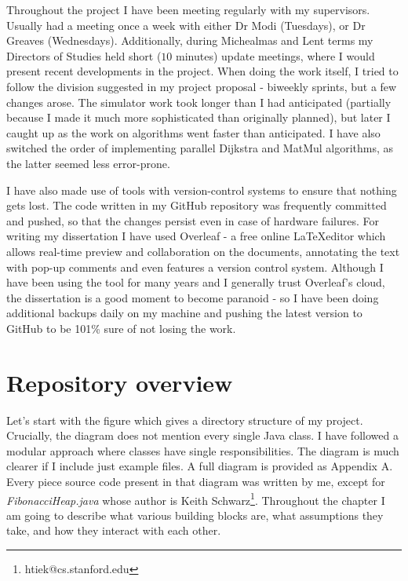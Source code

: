 \documentclass[12pt,a4paper,twoside,openright]{report}
\begin{document}
Throughout the project I have been meeting regularly with my supervisors. Usually had a meeting once a week with either Dr Modi (Tuesdays), or Dr Greaves (Wednesdays). Additionally, during Michealmas and Lent terms my Directors of Studies held short ($10$ minutes) update meetings, where I would present recent developments in the project. When doing the work itself, I tried to follow the division suggested in my project proposal - biweekly sprints, but a few changes arose. The simulator work took longer than I had anticipated (partially because I made it much more sophisticated than originally planned), but later I caught up as the work on algorithms went faster than anticipated. I have also switched the order of implementing parallel Dijkstra and MatMul algorithms, as the latter seemed less  error-prone.  

I have also made use of tools with version-control systems to ensure that nothing gets lost. The code written in my GitHub repository was frequently committed and pushed, so that the changes persist even in case of hardware failures. For writing my dissertation I have used Overleaf - a free online \LaTeX editor which allows real-time preview and collaboration on the documents, annotating the text with pop-up comments and even features a version control system. Although I have been using the tool for many years and I generally trust Overleaf's cloud, the dissertation is a good moment to become paranoid - so I have been doing additional backups daily on my machine and pushing the latest version to GitHub to be 101\% sure of not losing the work.

\section{Repository overview}
Let's start with the figure which gives a directory structure of my project. Crucially, the diagram does not mention every single Java class. I have followed a modular approach where classes have single responsibilities. The diagram is much clearer if I include just example files. A full diagram is provided as Appendix A. Every piece source code present in that diagram was written by me, except for \textit{FibonacciHeap.java} whose author is Keith Schwarz\footnote{htiek@cs.stanford.edu}. Throughout the chapter I am going to describe what various building blocks are, what assumptions they take, and how they interact with each other.

\end{document}
